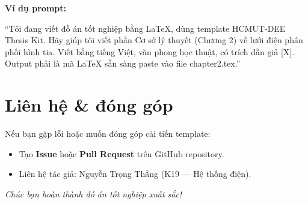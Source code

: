 \textbf{Ví dụ prompt:}

\begin{tcolorbox}[title={Prompt mẫu cho AI}, colback=CodeBG]
\small
``Tôi đang viết đồ án tốt nghiệp bằng LaTeX, dùng template HCMUT-DEE Thesis Kit. Hãy giúp tôi viết phần Cơ sở lý thuyết (Chương 2) về lưới điện phân phối hình tia. Viết bằng tiếng Việt, văn phong học thuật, có trích dẫn giả [X]. Output phải là mã LaTeX sẵn sàng paste vào file chapter2.tex.''
\end{tcolorbox}

\section{Liên hệ \& đóng góp}

Nếu bạn gặp lỗi hoặc muốn đóng góp cải tiến template:

\begin{itemize}
  \item Tạo \textbf{Issue} hoặc \textbf{Pull Request} trên GitHub repository.
  \item Liên hệ tác giả: Nguyễn Trọng Thắng (K19 --- Hệ thống điện).
\end{itemize}

\begin{center}
  \textit{Chúc bạn hoàn thành đồ án tốt nghiệp xuất sắc!}
\end{center}
